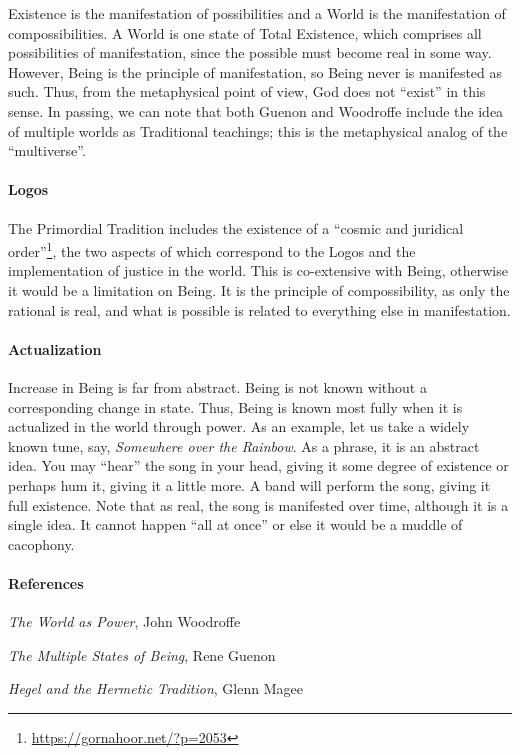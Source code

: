Existence is the manifestation of possibilities and a World is the manifestation of compossibilities. A World is one state of Total Existence, which comprises all possibilities of manifestation, since the possible must become real in some way. However, Being is the principle of manifestation, so Being never is manifested as such. Thus, from the metaphysical point of view, God does not ``exist'' in this sense. In passing, we can note that both Guenon and Woodroffe include the idea of multiple worlds as Traditional teachings; this is the metaphysical analog of the ``multiverse''.

\paragraph{Logos}


The Primordial Tradition includes the existence of a ``cosmic and juridical order''\footnote{\url{https://gornahoor.net/?p=2053}}, the two aspects of which correspond to the Logos and the implementation of justice in the world. This is co-extensive with Being, otherwise it would be a limitation on Being. It is the principle of compossibility, as only the rational is real, and what is possible is related to everything else in manifestation.

\paragraph{Actualization}


Increase in Being is far from abstract. Being is not known without a corresponding change in state. Thus, Being is known most fully when it is actualized in the world through power. As an example, let us take a widely known tune, say, \emph{Somewhere over the Rainbow}. As a phrase, it is an abstract idea. You may ``hear'' the song in your head, giving it some degree of existence or perhaps hum it, giving it a little more. A band will perform the song, giving it full existence. Note that as real, the song is manifested over time, although it is a single idea. It cannot happen ``all at once'' or else it would be a muddle of cacophony.

\paragraph{References}

\emph{The World as Power}, John Woodroffe

\emph{The Multiple States of Being}, Rene Guenon

\emph{Hegel and the Hermetic Tradition}, Glenn Magee



